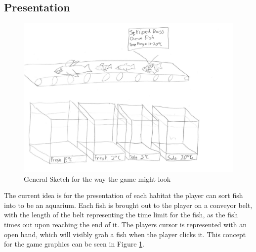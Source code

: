 \documentclass[12pt, a4paper]{article}
\begin{document}
\subsection{Presentation}
\begin{figure}
\centering
\includegraphics[width=\textwidth]{Sketches/GameConcept2.png}
\caption{General Sketch for the way the game might look}\label{GameConceptSketch2}
\end{figure}
The current idea is for the presentation of each habitat the player can sort fish into to be an aquarium. Each fish is brought out to the player on a conveyor belt, with the length of the belt representing the time limit for the fish, as the fish times out upon reaching the end of it. The players cursor is represented with an open hand, which will visibly grab a fish when the player clicks it. This concept for the game graphics can be seen in Figure \ref{GameConceptSketch2}.\\
\end{document}
